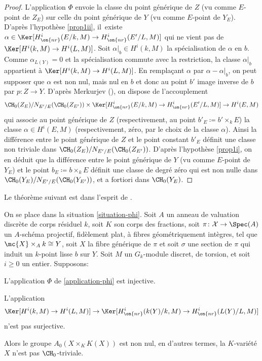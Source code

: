 \begin{proof}
L'application $\Phi$ envoie la classe du point générique de
$Z$ (vu comme $E$-point de $Z_E$) sur celle du point générique de $Y$ (vu comme $E$-point de $Y_E$). D'après l'hypothèse \eqref{prop1ii}, il~existe $\alpha \in \Ker [H^i_{\on{nr}}(E/k,M) \to H^i_{\on{nr}}(E'/L,M)]$ qui ne vient pas de $\Ker[H^i(k,M) \to H^i(L,M)]$. Soit $\alpha|_b\in H^i(k,M)$ la spécialisation de $\alpha$ en $b$. Comme $\alpha_{L(Y)}=0$ et la spécialisation commute avec la restriction, la classe $\alpha|_b$ appartient à $\Ker[H^i(k,M) \to H^i(L,M)]$. En remplaçant $\alpha$ par $\alpha-\alpha|_b$, on peut supposer que $\alpha$ est non nul, mais nul en $b$ et donc au point $b'$ image inverse de $b$ par $p\colon Z \to Y$. D'après Merkurjev \cite[Cor.\,2.9]{merkurjev2008unramified} (\cf \cite[Cor.\,5.2]{schreieder2021unramified}), on dispose
de l'accouplement
\[\CH_{0}(Z_{E})/ N_{E'/E}(\CH_{0}(Z_{E'})) \times \Ker [H^i_{\on{nr}}(E/k,M) \to H^i_{\on{nr}}(E'/L,M)] \to H^i(E,M)\]
qui associe au point générique de $Z$ (respectivement, au point $b'_{E}\coloneqq b'\times_k E$) la classe $\alpha \in H^{i}(E,M)$ (respectivement, zéro, par le choix de la classe $\alpha$). Ainsi la différence entre le point générique de $Z$ et le point constant $b'_E$
définit une classe non triviale dans $\CH_{0}(Z_{E})/ N_{E'/E}(\CH_{0}(Z_{E'}))$. D'après l'hypothèse \eqref{prop1i}, on en déduit que
la différence entre le point générique de $Y$ (vu comme $E$-point de $Y_E$) et le point $b_{E}\coloneqq b\times_{k}E$
définit une classe de degré zéro qui est non nulle dans $\CH_{0}(Y_{E})/ N_{E'/E}(\CH_{0}(Y_{E'}))$,
et a fortiori dans $\CH_{0}(Y_{E})$.
\end{proof}

Le théorème suivant est dans l'esprit de \cite[Th.\,1.14]{colliot2016hypersurfaces}.

\begin{thm}\label{1.14K}
On se place dans la situation \ref{situation-phi}. Soit $A$ un anneau de valuation discrète de corps résiduel $k$, soit $K$ son corps des fractions, soit $\pi \colon { \mathcal{X}} \to \Spec(A)$ un $A$\nobreakdash-schéma projectif, fidèlement plat, à fibres géométriquement intègres, tel que \hbox{$\mc{X}\times_Ak\cong Y$}, soit $X$ la fibre générique de $\pi$ et soit $\sigma$ une section de $\pi$ qui induit un $k$-point lisse $b$ sur $Y$. Soit $M$ un $G_k$-module discret, de torsion, et soit $i\geq 0$ un entier. Supposons:
\begin{enumeratei}
\item\label{1.14Ki}
L'application $\Phi$ de \eqref{application-phi} est injective.
\item\label{1.14Kii}
L'application \[\Ker[H^i(k,M) \to H^i(L,M)] \to \Ker [H^i_{\on{nr}}(k(Y)/k,M) \to H^i_{\on{nr}}(L(Y)/L,M)]\] n'est pas
surjective.
\end{enumeratei}
Alors le groupe $A_{0}(X\times_{K}K(X))$ est non nul, en d'autres termes,
la $K$-variété $X$ n'est pas $\CH_{0}$-triviale.
\end{thm}

